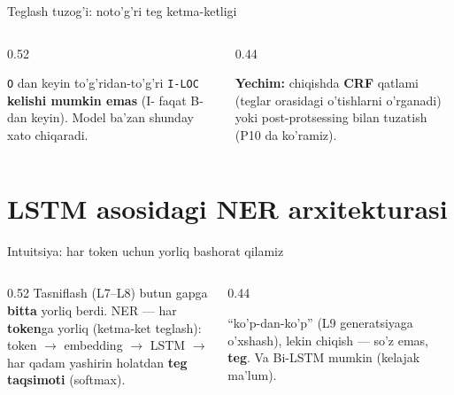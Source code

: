 \documentclass[aspectratio=169,11pt]{beamer}
\begin{document}
\begin{frame}{Teglash tuzog'i: noto'g'ri teg ketma-ketligi}
  \begin{columns}[T]
    \begin{column}{0.52\textwidth}
      \begin{tcolorbox}[warnbox,title=Imkonsiz ketma-ketlik]
        \small
        \texttt{O} dan keyin to'g'ridan-to'g'ri \texttt{I-LOC} \textbf{kelishi
        mumkin emas} (I- faqat B- dan keyin). Model ba'zan shunday xato chiqaradi.
      \end{tcolorbox}
    \end{column}
    \begin{column}{0.44\textwidth}
      \begin{tcolorbox}[okbox,top=2pt,bottom=2pt]
        \footnotesize
        \textbf{Yechim:} chiqishda \textbf{CRF} qatlami (teglar orasidagi o'tishlarni
        o'rganadi) yoki post-protsessing bilan tuzatish (P10 da ko'ramiz).
      \end{tcolorbox}
    \end{column}
  \end{columns}
\end{frame}

\section[Arxitektura]{LSTM asosidagi NER arxitekturasi}

\begin{frame}{Intuitsiya: har token uchun yorliq bashorat qilamiz}
  \begin{columns}[T]
    \begin{column}{0.52\textwidth}
      \small
      Tasniflash (L7--L8) butun gapga \textbf{bitta} yorliq berdi. NER --- har
      \textbf{token}ga yorliq (ketma-ket teglash):\\[6pt]
      token $\to$ embedding $\to$ LSTM $\to$ har qadam yashirin holatdan
      \textbf{teg taqsimoti} (softmax).
    \end{column}
    \begin{column}{0.44\textwidth}
      \begin{tcolorbox}[okbox,top=2pt,bottom=2pt]
        \footnotesize
        ``ko'p-dan-ko'p'' (L9 generatsiyaga o'xshash), lekin chiqish --- so'z emas,
        \textbf{teg}. Va Bi-LSTM mumkin (kelajak ma'lum).
      \end{tcolorbox}
    \end{column}
  \end{columns}
\end{frame}
\end{document}
